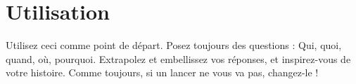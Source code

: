 \documentclass{article}
\begin{document}
\title{\vspace{-1cm}{\Huge One-Roll NPCs} \vspace{-1cm}}

\date{}

\maketitle

\section*{Utilisation}
Utilisez ceci comme point de départ. Posez toujours des questions : Qui, quoi, quand, où, pourquoi. Extrapolez et embellissez vos réponses, et inspirez-vous de votre histoire. Comme toujours, si un lancer ne vous va pas, changez-le !
\end{document}
